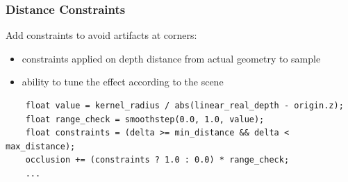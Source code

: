 \documentclass{beamer}
\begin{document}
\begin{frame}[fragile]
\frametitle{Distance Constraints}
Add constraints to avoid artifacts at corners:
\begin{itemize}
    \item constraints applied on depth distance from actual geometry to sample
    \item ability to tune the effect according to the scene
\end{itemize}


\begin{verbatim}
    float value = kernel_radius / abs(linear_real_depth - origin.z);
    float range_check = smoothstep(0.0, 1.0, value);
    float constraints = (delta >= min_distance && delta < max_distance);
    occlusion += (constraints ? 1.0 : 0.0) * range_check;
    ...
\end{verbatim}
\end{frame}
\end{document}
